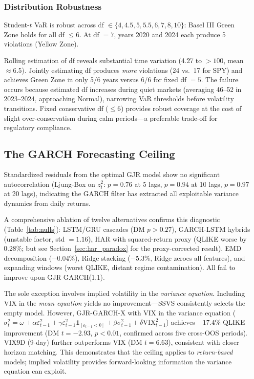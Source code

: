 \subsubsection{Distribution Robustness}

Student-$t$ VaR is robust across df $\in \{4, 4.5, 5, 5.5, 6, 7, 8, 10\}$: Basel III Green Zone holds for all df $\leq 6$. At df $= 7$, years 2020 and 2024 each produce 5 violations (Yellow Zone).

Rolling estimation of df reveals substantial time variation (4.27 to $>100$, mean $\approx 6.5$). Jointly estimating df produces \textit{more} violations (24 vs.\ 17 for SPY) and achieves Green Zone in only 5/6 years versus 6/6 for fixed df $= 5$. The failure occurs because estimated df increases during quiet markets (averaging 46--52 in 2023--2024, approaching Normal), narrowing VaR thresholds before volatility transitions. Fixed conservative df ($\leq 6$) provides robust coverage at the cost of slight over-conservatism during calm periods---a preferable trade-off for regulatory compliance.

\subsection{The GARCH Forecasting Ceiling}

Standardized residuals from the optimal GJR model show no significant autocorrelation (Ljung-Box on $z^2_t$: $p = 0.76$ at 5 lags, $p = 0.94$ at 10 lags, $p = 0.97$ at 20 lags), indicating the GARCH filter has extracted all exploitable variance dynamics from daily returns.

A comprehensive ablation of twelve alternatives confirms this diagnostic (Table~\ref{tab:nulls}): LSTM/GRU cascades (DM $p > 0.27$), GARCH-LSTM hybrids (unstable factor, std $= 1.16$), HAR with squared-return proxy (QLIKE worse by 0.28\%; but see Section~\ref{sec:har_paradox} for the proxy-corrected result), EMD decomposition ($-0.04\%$), Ridge stacking ($-5.3\%$, Ridge zeroes all features), and expanding windows (worst QLIKE, distant regime contamination). All fail to improve upon GJR-GARCH(1,1).

The sole exception involves implied volatility in the \textit{variance equation}. Including VIX in the \textit{mean equation} yields no improvement---SSVS consistently selects the empty model. However, GJR-GARCH-X with VIX in the variance equation ($\sigma^2_t = \omega + \alpha \varepsilon^2_{t-1} + \gamma \varepsilon^2_{t-1} \mathbf{1}_{[\varepsilon_{t-1}<0]} + \beta \sigma^2_{t-1} + \delta \text{VIX}^2_{t-1}$) achieves $-17.4\%$ QLIKE improvement (DM $t = -2.93$, $p < 0.01$, confirmed across five cross-OOS periods). VIX9D (9-day) further outperforms VIX (DM $t = 6.63$), consistent with closer horizon matching. This demonstrates that the ceiling applies to \textit{return-based} models; implied volatility provides forward-looking information the variance equation can exploit.

